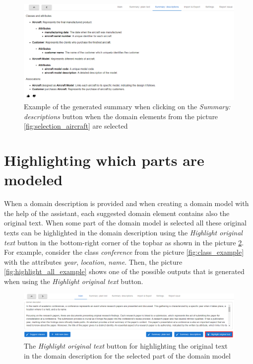 \begin{figure}[!h]
    \includegraphics[scale=0.41]{../docs/images/frontend/summary-descriptions.png}
    \caption{\centering Example of the generated summary when clicking on the \textit{Summary: descriptions} button when the domain elements from the picture \ref{fig:selection_aircraft} are selected}
    \label{fig:summary_description}
\end{figure}

\clearpage

\section{Highlighting which parts are modeled}

When a domain description is provided and when creating a domain model with the help of the assistant, each suggested domain element contains also the original text. When some part of the domain model is selected all these original texts can be highlighted in the domain description using the \textit{Highlight original text} button in the bottom-right corner of the topbar as shown in the picture \ref{fig:highlight_original_text_button}. For example, consider the class \textit{conference} from the picture \ref{fig:class_example} with the attributes \textit{year}, \textit{location}, \textit{name}. Then, the picture \ref{fig:highlight_all_example} shows one of the possible outputs that is generated when using the \textit{Highlight original text} button.

\begin{figure}[!h]
    \includegraphics[scale=0.29]{../docs/images/frontend/highlight-original-text-button.png}
    \caption{\centering The \textit{Highlight original text} button for highlighting the original text in the domain description for the selected part of the domain model}
    \label{fig:highlight_original_text_button}
\end{figure}


